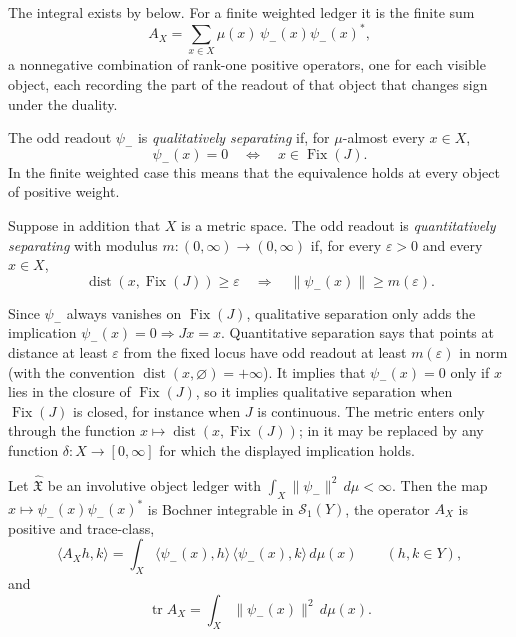 \documentclass[11pt]{article}
\DeclareMathOperator{\Fix}{Fix}
\DeclareMathOperator{\dist}{dist}
\DeclareMathOperator{\trace}{tr}
\newcommand{\psim}{\psi_{-}}
\newcommand{\AX}{A_{X}}
\newcommand{\IOL}{\hat{\mathfrak{X}}}
\theoremstyle{definition}
\begin{document}
The integral exists by 
below.  For a finite weighted ledger it is the finite sum
\[
  \AX=\sum_{x\in X}\mu(x)\,\psim(x)\psim(x)^*,
\]
a nonnegative combination of rank-one positive operators, one for each
visible object, each recording the part of the readout of that object
that changes sign under the duality.

\begin{definition}
\label{def:duality_confinement:separating-readout}
The odd readout \(\psim\) is \emph{qualitatively separating} if, for
\(\mu\)-almost every \(x\in X\),
\[
  \psim(x)=0
  \quad\Longleftrightarrow\quad
  x\in\Fix(J).
\]
In the finite weighted case this means that the equivalence holds at
every object of positive weight.

Suppose in addition that \(X\) is a metric space.  The odd readout is
\emph{quantitatively separating} with modulus
\(m:(0,\infty)\to(0,\infty)\) if, for every \(\varepsilon>0\) and every
\(x\in X\),
\[
  \dist(x,\Fix(J))\geq\varepsilon
  \quad\Longrightarrow\quad
  \|\psim(x)\|\geq m(\varepsilon).
\]
\end{definition}

Since \(\psim\) always vanishes on \(\Fix(J)\), qualitative separation
only adds the implication \(\psim(x)=0\Rightarrow Jx=x\).  Quantitative
separation says that points at distance at least \(\varepsilon\) from the
fixed locus have odd readout at least \(m(\varepsilon)\) in norm
(with the convention \(\dist(x,\varnothing)=+\infty\)).  It implies
that \(\psim(x)=0\) only if \(x\) lies in the closure of \(\Fix(J)\), so
it implies qualitative separation when \(\Fix(J)\) is closed, for
instance when \(J\) is continuous.  The metric enters only through the function \(x\mapsto\dist(x,\Fix(J))\);
in  it may be
replaced by any function \(\delta:X\to[0,\infty]\) for which the
displayed implication holds.

\begin{lemma}
\label{lem:duality_confinement:trace-identity}
Let \(\IOL\) be an involutive object ledger with
\(\int_X\|\psim\|^2\,d\mu<\infty\).  Then the map
\(x\mapsto\psim(x)\psim(x)^*\) is Bochner integrable in
\(\mathcal S_1(Y)\), the operator \(\AX\) is positive and trace-class,
\[
  \langle\AX h,k\rangle=\int_X\langle\psim(x),h\rangle\,
  \langle\psim(x),k\rangle\,d\mu(x)\qquad(h,k\in Y),
\]
and
\[
  \trace\AX=\int_X\|\psim(x)\|^2\,d\mu(x).
\]
\end{lemma}
\end{document}
